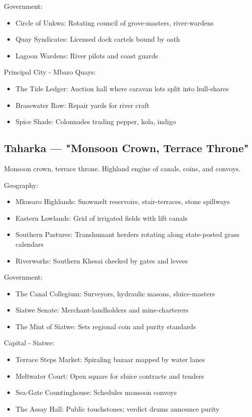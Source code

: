 Government:
\begin{itemize}
    \item Circle of Unkwa: Rotating council of grove-masters, river-wardens
    \item Quay Syndicates: Licensed dock cartels bound by oath
    \item Lagoon Wardens: River pilots and coast guards
\end{itemize}

Principal City - Mbaro Quays:
\begin{itemize}
    \item The Tide Ledger: Auction hall where caravan lots split into hull-shares
    \item Brasswater Row: Repair yards for river craft
    \item Spice Shade: Colonnades trading pepper, kola, indigo
\end{itemize}

\subsection{Taharka — "Monsoon Crown, Terrace Throne"}
\label{sec:taharka}

Monsoon crown, terrace throne. Highland engine of canals, coins, and convoys.

Geography:
\begin{itemize}
    \item Mkusaro Highlands: Snowmelt reservoirs, stair-terraces, stone spillways
    \item Eastern Lowlands: Grid of irrigated fields with lift canals
    \item Southern Pastures: Transhumant herders rotating along state-posted grass calendars
    \item Riverworks: Southern Khesai checked by gates and levees
\end{itemize}

Government:
\begin{itemize}
    \item The Canal Collegium: Surveyors, hydraulic masons, sluice-masters
    \item Siatwe Senate: Merchant-landholders and mine-charterers
    \item The Mint of Siatwe: Sets regional coin and purity standards
\end{itemize}

Capital - Siatwe:
\begin{itemize}
    \item Terrace Steps Market: Spiraling bazaar mapped by water lanes
    \item Meltwater Court: Open square for sluice contracts and tenders
    \item Sea-Gate Countinghouse: Schedules monsoon convoys
    \item The Assay Hall: Public touchstones; verdict drums announce purity
\end{itemize}

